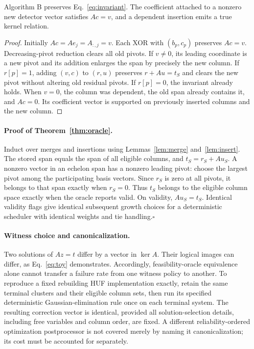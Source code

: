 \begin{lemma}\label{lem:insert}
Algorithm B preserves Eq.~\eqref{eq:invariant}. The coefficient attached to a nonzero new detector vector satisfies $Ac=v$, and a dependent insertion emits a true kernel relation.
\end{lemma}
\begin{proof}
Initially $Ac=Ae_j=A_{:,j}=v$. Each XOR with $(b_p,c_p)$ preserves $Ac=v$. Decreasing-pivot reduction clears all old pivots. If $v\ne0$, its leading coordinate is a new pivot and its addition enlarges the span by precisely the new column. If $r[p]=1$, adding $(v,c)$ to $(r,u)$ preserves $r+Au=t_S$ and clears the new pivot without altering old residual pivots. If $r[p]=0$, the invariant already holds. When $v=0$, the column was dependent, the old span already contains it, and $Ac=0$. Its coefficient vector is supported on previously inserted columns and the new column.
\end{proof}

\paragraph{Proof of Theorem~\ref{thm:oracle}.}
Induct over merges and insertions using Lemmas~\ref{lem:merge} and~\ref{lem:insert}. The stored span equals the span of all eligible columns, and $t_S=r_S+Au_S$. A nonzero vector in an echelon span has a nonzero leading pivot: choose the largest pivot among the participating basis vectors. Since $r_S$ is zero at all pivots, it belongs to that span exactly when $r_S=0$. Thus $t_S$ belongs to the eligible column space exactly when the oracle reports valid. On validity, $Au_S=t_S$. Identical validity flags give identical subsequent growth choices for a deterministic scheduler with identical weights and tie handling.\hfill$\square$

\paragraph{Witness choice and canonicalization.}
Two solutions of $Az=t$ differ by a vector in $\ker A$. Their logical images can differ, as Eq.~\eqref{eq:toy} demonstrates. Accordingly, feasibility-oracle equivalence alone cannot transfer a failure rate from one witness policy to another. To reproduce a fixed rebuilding HUF implementation exactly, retain the same terminal clusters and their eligible column sets, then run its specified deterministic Gaussian-elimination rule once on each terminal system. The resulting correction vector is identical, provided all solution-selection details, including free variables and column order, are fixed. A different reliability-ordered optimization postprocessor is not covered merely by naming it canonicalization; its cost must be accounted for separately.

